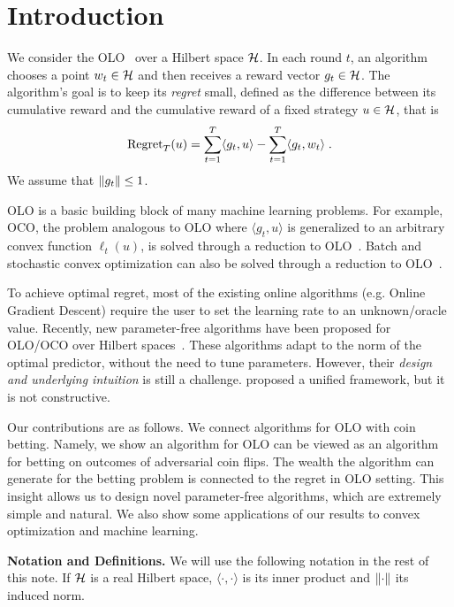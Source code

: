 \section{Introduction}
\label{section:introduction}

We consider the \ac{OLO}~\citep{Cesa-Bianchi-Lugosi-2006, Shalev-Shwartz-2011}
over a Hilbert space $\mathcal{H}$. In each round $t$, an algorithm chooses a point $w_t
\in \mathcal{H}$ and then receives a reward vector $g_t \in \mathcal{H}$. The algorithm's goal is
to keep its \emph{regret} small, defined as the difference between its
cumulative reward and the cumulative reward of a fixed strategy $u \in \mathcal{H}$,
that is
\[
\operatorname{Regret}_T(u) = \sum_{t=1}^T \langle g_t, u \rangle - \sum_{t=1}^T \langle g_t, w_t \rangle \; .
\]
We assume that $\left\|{g_t}\right\| \le 1$.

\ac{OLO} is a basic building block of many machine learning problems. For
example, \ac{OCO}, the problem analogous to \ac{OLO} where $\langle g_t, u
\rangle$ is generalized to an arbitrary convex function $\ell_t(u)$, is solved
through a reduction to \ac{OLO}~\citep{Shalev-Shwartz-2011}.  Batch and
stochastic convex optimization can also be solved through a reduction to
\ac{OLO}~\citep{Shalev-Shwartz-2011}.

To achieve optimal regret, most of the existing online algorithms (e.g.  Online
Gradient Descent) require the user to set the learning rate to an
unknown/oracle value. Recently, new parameter-free algorithms have been
proposed for \ac{OLO}/\ac{OCO} over Hilbert
spaces~\citep{Streeter-McMahan-2012, Orabona-2013, McMahan-Abernethy-2013,
McMahan-Orabona-2014, Orabona-2014}.  These algorithms adapt to the norm of the
optimal predictor, without the need to tune parameters. However, their
\emph{design and underlying intuition} is still a challenge.
\citet{Foster-Rakhlin-Sridharan-2015} proposed a unified framework, but it is
not constructive.

Our contributions are as follows. We connect algorithms for \ac{OLO} with coin
betting. Namely, we show an algorithm for \ac{OLO} can be viewed as an
algorithm for betting on outcomes of adversarial coin flips. The wealth the
algorithm can generate for the betting problem is connected to the regret in
\ac{OLO} setting. This insight allows us to design novel parameter-free
algorithms, which are extremely simple and natural. We also show some
applications of our results to convex optimization and machine learning.

\noindent\textbf{Notation and Definitions.}
We will use the following notation in the rest of this note.  If $\mathcal{H}$ is a real
Hilbert space, $\langle \cdot, \cdot \rangle$ is its inner product and
$\left\|{\cdot}\right\|$ its induced norm.
